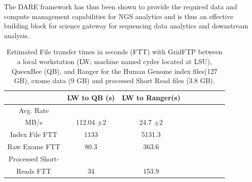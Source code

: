 \documentclass[]{svjour3}
\begin{document}
The DARE framework has thus been shown to provide the required data
and compute management capabilities for NGS analytics and is thus an
effective building block for science gateway for sequencing data
analytics and downstream analysis.

 \begin{table}
\centering
 \small
 \begin{tabular}{|c|c|c|c|c|c|c|c|c|} 
 \hline  
 	          & LW to QB (s)  & LW to Ranger(s) \\
 \hline                       
Avg. Rate && \\
MB/s & 112.04 $\pm 2$ &	    24.7 $\pm 2$  \\
 \hline                       
Index File	FTT & 1133  &	    5131.3      \\        
 \hline                       
Raw 	 Exome FTT&80.3 & 363.6\\                  
 \hline                       
Processed Short-&    & \\
Reads FTT&34&153.9  \\
 \hline                       
\end{tabular}
\caption{Estimated File transfer times in seconds (FTT) with GridFTP
  between a local workstation (LW; machine named cyder located at
  LSU), QueenBee (QB), and Ranger for the Human Genome index files(127
  GB), exome data (9 GB) and processed Short Read files (3.8 GB).}

 \label{table:NGS-Distributed-file} 
\end{table}
\end{document}
